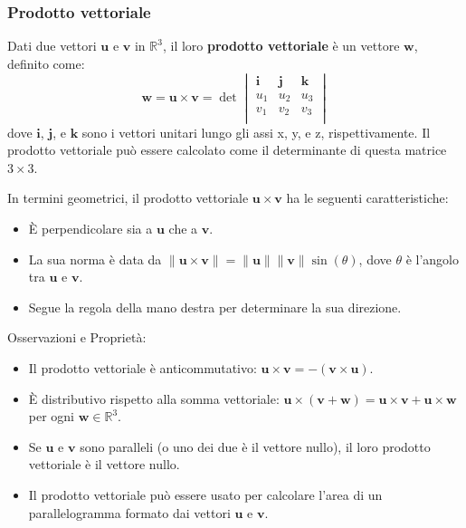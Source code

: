 \documentclass{book}
\begin{document}
\subsubsection{Prodotto vettoriale}
\noindent\begin{minipage}{\textwidth}
    \begin{theorem}
        Dati due vettori \(\mathbf{u}\) e \(\mathbf{v}\) in \(\mathbb{R}^3\), il loro \textbf{prodotto vettoriale} è un vettore \(\mathbf{w}\), definito come:
        \[
            \mathbf{w} = \mathbf{u} \times \mathbf{v} = \det
            \begin{vmatrix}
                \mathbf{i} & \mathbf{j} & \mathbf{k} \\
                u_1        & u_2        & u_3        \\
                v_1        & v_2        & v_3        \\
            \end{vmatrix}
        \]
        dove \(\mathbf{i}\), \(\mathbf{j}\), e \(\mathbf{k}\) sono i vettori unitari lungo gli assi x, y, e z, rispettivamente. Il prodotto vettoriale può essere calcolato come il determinante di questa matrice \(3 \times 3\).

        In termini geometrici, il prodotto vettoriale \(\mathbf{u} \times \mathbf{v}\) ha le seguenti caratteristiche:
        \begin{itemize}
            \item È perpendicolare sia a \(\mathbf{u}\) che a \(\mathbf{v}\).
            \item La sua norma è data da \(\|\mathbf{u} \times \mathbf{v}\| = \|\mathbf{u}\| \|\mathbf{v}\| \sin(\theta)\), dove \(\theta\) è l'angolo tra \(\mathbf{u}\) e \(\mathbf{v}\).
            \item Segue la regola della mano destra per determinare la sua direzione.
        \end{itemize}
        \noindent Osservazioni e Proprietà:
        \begin{itemize}
            \item Il prodotto vettoriale è anticommutativo: \(\mathbf{u} \times \mathbf{v} = -(\mathbf{v} \times \mathbf{u})\).
            \item È distributivo rispetto alla somma vettoriale: \(\mathbf{u} \times (\mathbf{v} + \mathbf{w}) = \mathbf{u} \times \mathbf{v} + \mathbf{u} \times \mathbf{w}\) per ogni \(\mathbf{w} \in \mathbb{R}^3\).
            \item Se \(\mathbf{u}\) e \(\mathbf{v}\) sono paralleli (o uno dei due è il vettore nullo), il loro prodotto vettoriale è il vettore nullo.
            \item Il prodotto vettoriale può essere usato per calcolare l'area di un parallelogramma formato dai vettori \(\mathbf{u}\) e \(\mathbf{v}\).
        \end{itemize}
    \end{theorem}
\end{minipage}
\end{document}
